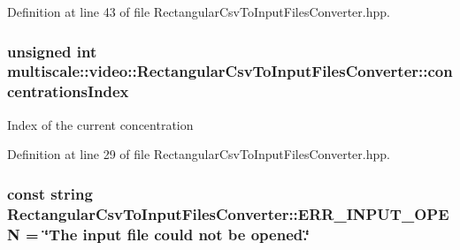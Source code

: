 \-Definition at line 43 of file \-Rectangular\-Csv\-To\-Input\-Files\-Converter.\-hpp.

\hypertarget{classmultiscale_1_1video_1_1RectangularCsvToInputFilesConverter_a48b31e858d0ebac757af77703202634f}{
\subsubsection[{concentrations\-Index}]{\setlength{\rightskip}{0pt plus 5cm}unsigned int {\bf multiscale\-::video\-::\-Rectangular\-Csv\-To\-Input\-Files\-Converter\-::concentrations\-Index}}}\label{classmultiscale_1_1video_1_1RectangularCsvToInputFilesConverter_a48b31e858d0ebac757af77703202634f}
\-Index of the current concentration 

\-Definition at line 29 of file \-Rectangular\-Csv\-To\-Input\-Files\-Converter.\-hpp.

\hypertarget{classmultiscale_1_1video_1_1RectangularCsvToInputFilesConverter_a5d23713c8025b1a50cfce86ae9e1a414}{
\subsubsection[{\-E\-R\-R\-\_\-\-I\-N\-P\-U\-T\-\_\-\-O\-P\-E\-N}]{\setlength{\rightskip}{0pt plus 5cm}const string {\bf \-Rectangular\-Csv\-To\-Input\-Files\-Converter\-::\-E\-R\-R\-\_\-\-I\-N\-P\-U\-T\-\_\-\-O\-P\-E\-N} = \char`\"{}\-The input file could not be opened.\char`\"{}}}\label{classmultiscale_1_1video_1_1RectangularCsvToInputFilesConverter_a5d23713c8025b1a50cfce86ae9e1a414}


